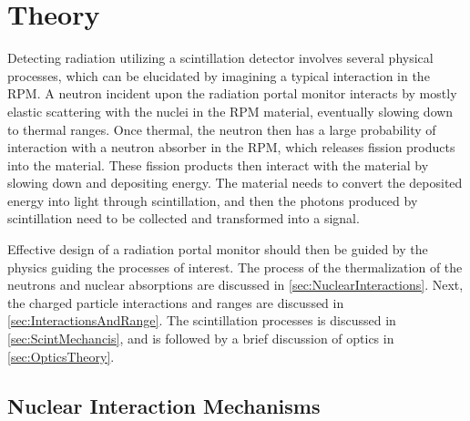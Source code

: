 \chapter{Theory}
\label{chap:theory}
Detecting radiation utilizing a scintillation detector involves several physical processes, which can be elucidated by imagining a typical interaction in the RPM.
A neutron incident upon the radiation portal monitor interacts by mostly elastic scattering with the nuclei in the RPM material, eventually slowing down to thermal ranges.
Once thermal, the neutron then has a large probability of interaction with a neutron absorber in the RPM, which releases fission products into the material.
These fission products then interact with the material by slowing down and depositing energy.
The material needs to convert the deposited energy into light through scintillation, and then the photons produced by scintillation need to be collected and transformed into a signal.

Effective design of a radiation portal monitor should then be guided by the physics guiding the processes of interest.
The process of the thermalization of the neutrons and nuclear absorptions are discussed in \autoref{sec:NuclearInteractions}.
Next, the charged particle interactions and ranges are discussed in \autoref{sec:InteractionsAndRange}.
The scintillation processes is discussed in \autoref{sec:ScintMechancis}, and is followed by a brief discussion of optics in \autoref{sec:OpticsTheory}.

 
\section{Nuclear Interaction Mechanisms}
\label{sec:NuclearInteractions}



